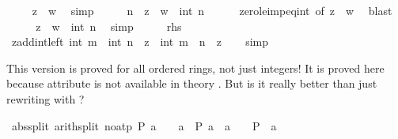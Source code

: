\begin{isabellebody}
\ \isamarkupfalse%
\ {\isachardoublequoteopen}{}\ {\isasymle}\ z\ {\isacharminus}{\kern0pt}\ w{\isachardoublequoteclose}\ \isamarkupfalse%
\ simp\isanewline
\ \ \isamarkupfalse%
\ \isamarkupfalse%
\ n\ \ {\isachardoublequoteopen}z\ {\isacharminus}{\kern0pt}\ w\ {\isacharequal}{\kern0pt}\ int\ n{\isachardoublequoteclose}\isanewline
\ \ \ \ \isamarkupfalse%
\ zero{\isacharunderscore}{\kern0pt}le{\isacharunderscore}{\kern0pt}imp{\isacharunderscore}{\kern0pt}eq{\isacharunderscore}{\kern0pt}int\ {\isacharbrackleft}{\kern0pt}of\ {\isachardoublequoteopen}z\ {\isacharminus}{\kern0pt}\ w{\isachardoublequoteclose}{\isacharbrackright}{\kern0pt}\ \isamarkupfalse%
\ blast\isanewline
\ \ \isamarkupfalse%
\ \isamarkupfalse%
\ {\isachardoublequoteopen}z\ {\isacharequal}{\kern0pt}\ w\ {\isacharplus}{\kern0pt}\ int\ n{\isachardoublequoteclose}\ \isamarkupfalse%
\ simp\isanewline
\ \ \isamarkupfalse%
\ \isamarkupfalse%
\ {\isacharquery}{\kern0pt}rhs\ \isacommand{{\isachardot}{\kern0pt}{\isachardot}{\kern0pt}}\isamarkupfalse%
\isanewline
{}\isamarkupfalse%
%
\endisatagproof
{\isafoldproof}%
%
\isadelimproof
\isanewline
%
\endisadelimproof
\isanewline
{}\isamarkupfalse%
\ zadd{\isacharunderscore}{\kern0pt}int{\isacharunderscore}{\kern0pt}left{\isacharcolon}{\kern0pt}\ {\isachardoublequoteopen}int\ m\ {\isacharplus}{\kern0pt}\ {\isacharparenleft}{\kern0pt}int\ n\ {\isacharplus}{\kern0pt}\ z{\isacharparenright}{\kern0pt}\ {\isacharequal}{\kern0pt}\ int\ {\isacharparenleft}{\kern0pt}m\ {\isacharplus}{\kern0pt}\ n{\isacharparenright}{\kern0pt}\ {\isacharplus}{\kern0pt}\ z{\isachardoublequoteclose}\isanewline
%
\isadelimproof
\ \ %
\endisadelimproof
%
\isatagproof
{}\isamarkupfalse%
\ simp%
\endisatagproof
{\isafoldproof}%
%
\isadelimproof
%
\endisadelimproof
%
\begin{isamarkuptext}%
This version is proved for all ordered rings, not just integers!
  It is proved here because attribute  is not available
  in theory .
  But is it really better than just rewriting with ?%
\end{isamarkuptext}\isamarkuptrue%
\isamarkupfalse%
\ abs{\isacharunderscore}{\kern0pt}split\ {\isacharbrackleft}{\kern0pt}arith{\isacharunderscore}{\kern0pt}split{\isacharcomma}{\kern0pt}\ no{\isacharunderscore}{\kern0pt}atp{\isacharbrackright}{\kern0pt}{\isacharcolon}{\kern0pt}\ {\isachardoublequoteopen}P\ {\isasymbar}a{\isasymbar}\ {\isasymlongleftrightarrow}\ {\isacharparenleft}{\kern0pt}{}\ {\isasymle}\ a\ {\isasymlongrightarrow}\ P\ a{\isacharparenright}{\kern0pt}\ {\isasymand}\ {\isacharparenleft}{\kern0pt}a\ {\isacharless}{\kern0pt}\ {}\ {\isasymlongrightarrow}\ P\ {\isacharparenleft}{\kern0pt}{\isacharminus}{\kern0pt}\ a{\isacharparenright}{\kern0pt}{\isacharparenright}{\kern0pt}{\isachardoublequoteclose}\isanewline

\end{isabellebody}
